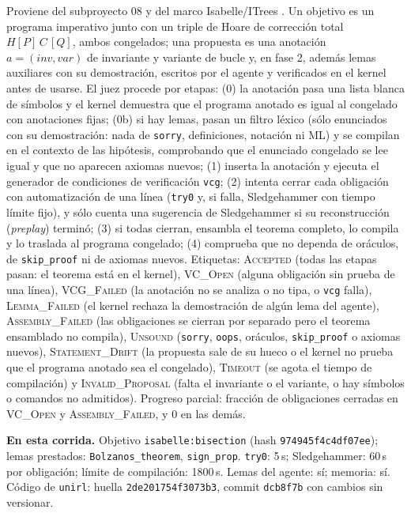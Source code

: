 \documentclass[11pt,a4paper]{article}
\begin{document}
Proviene del subproyecto 08 y del marco Isabelle/ITrees \citep{BryantHuertaFoster2026}. Un objetivo es un programa imperativo junto con un triple de Hoare de corrección total $H[P]\,C\,[Q]$, ambos congelados; una propuesta es una anotación $a = (\mathit{inv}, \mathit{var})$ de invariante y variante de bucle y, en fase 2, además lemas auxiliares con su demostración, escritos por el agente y verificados en el kernel antes de usarse. El juez procede por etapas: (0) la anotación pasa una lista blanca de símbolos y el kernel demuestra que el programa anotado es igual al congelado con anotaciones fijas; (0b) si hay lemas, pasan un filtro léxico (sólo enunciados con su demostración: nada de \texttt{sorry}, definiciones, notación ni ML) y se compilan en el contexto de las hipótesis, comprobando que el enunciado congelado se lee igual y que no aparecen axiomas nuevos; (1) inserta la anotación y ejecuta el generador de condiciones de verificación \texttt{vcg}; (2) intenta cerrar cada obligación con automatización de una línea (\texttt{try0} y, si falla, Sledgehammer con tiempo límite fijo), y sólo cuenta una sugerencia de Sledgehammer si su reconstrucción (\emph{preplay}) terminó; (3) si todas cierran, ensambla el teorema completo, lo compila y lo traslada al programa congelado; (4) comprueba que no dependa de oráculos, de \texttt{skip\_proof} ni de axiomas nuevos. Etiquetas: \textsc{Accepted} (todas las etapas pasan: el teorema está en el kernel), \textsc{VC\_Open} (alguna obligación sin prueba de una línea), \textsc{VCG\_Failed} (la anotación no se analiza o no tipa, o \texttt{vcg} falla), \textsc{Lemma\_Failed} (el kernel rechaza la demostración de algún lema del agente), \textsc{Assembly\_Failed} (las obligaciones se cierran por separado pero el teorema ensamblado no compila), \textsc{Unsound} (\texttt{sorry}, \texttt{oops}, oráculos, \texttt{skip\_proof} o axiomas nuevos), \textsc{Statement\_Drift} (la propuesta sale de su hueco o el kernel no prueba que el programa anotado sea el congelado), \textsc{Timeout} (se agota el tiempo de compilación) y \textsc{Invalid\_Proposal} (falta el invariante o el variante, o hay símbolos o comandos no admitidos). Progreso parcial: fracción de obligaciones cerradas en \textsc{VC\_Open} y \textsc{Assembly\_Failed}, y $0$ en las demás.

\textbf{En esta corrida.} Objetivo \texttt{isabelle:\allowbreak{}bisection} (hash \texttt{974945f4c4df07ee}); lemas prestados: \texttt{Bolzanos\_\allowbreak{}theorem}, \texttt{sign\_\allowbreak{}prop}. \texttt{try0}: 5\,s; Sledgehammer: 60\,s por obligación; límite de compilación: 1800\,s. Lemas del agente: sí; memoria: sí. Código de \texttt{unirl}: huella \texttt{2de201754f3073b3}, commit \texttt{dcb8f7b} con cambios sin versionar.
\end{document}
